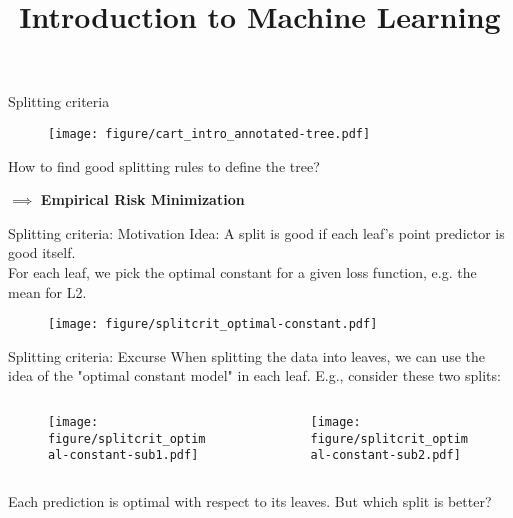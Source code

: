 \documentclass[11pt,compress,t,notes=noshow, xcolor=table]{beamer}
\title{Introduction to Machine Learning}
\institute{\href{https://compstat-lmu.github.io/lecture_i2ml/}{compstat-lmu.github.io/lecture\_i2ml}}
\date{}
\begin{document}
\sloppy


\begin{frame}{Splitting criteria}

 \begin{figure}
    \centering
      \texttt{[image: figure/cart\_intro\_annotated-tree.pdf]}
    \end{figure}

How to find good splitting rules to define the tree?
\lz

$\implies$ \textbf{Empirical Risk Minimization}

\end{frame}

\begin{vbframe}{Splitting criteria: Motivation}
Idea: A split is good if each leaf's point predictor is good itself. \\

For each leaf, we pick the optimal constant for a given loss function, e.g. the mean for L2.


\begin{figure}
\texttt{[image: figure/splitcrit\_optimal-constant.pdf]} 
\end{figure}



\end{vbframe}



\begin{vbframe}{Splitting criteria: Excurse}
When splitting the data into leaves, we can use the idea of the "optimal constant model" in each leaf. E.g., consider these two splits:

\begin{columns}
\begin{column}{0.5\textwidth}

\color{fgcolor}

\begin{figure}
\texttt{[image: figure/splitcrit\_optimal-constant-sub1.pdf]} 
\end{figure}

 
\end{column}
\begin{column}{0.5\textwidth}

\begin{figure}
\texttt{[image: figure/splitcrit\_optimal-constant-sub2.pdf]} 
\end{figure}

\end{column}
\end{columns}

Each prediction is optimal with respect to its leaves. But which split is better?

\end{vbframe}
\end{document}

